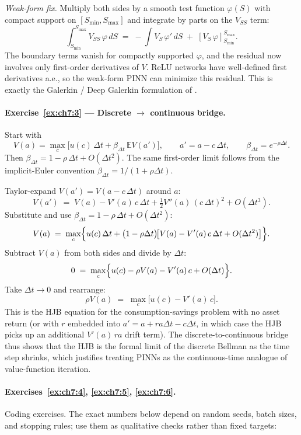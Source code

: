 \documentclass[11pt,a4paper]{report}
\begin{document}
\emph{Weak-form fix.}  Multiply both sides by a smooth test function $\varphi(S)$ with compact support on $[S_\mathrm{min}, S_\mathrm{max}]$ and integrate by parts on the $V_{SS}$ term:
\[
   \int_{S_\mathrm{min}}^{S_\mathrm{max}}\! V_{SS}\,\varphi\, dS \;=\; -\int V_S\,\varphi'\, dS \;+\;[V_S\,\varphi]_{S_\mathrm{min}}^{S_\mathrm{max}}.
\]
The boundary terms vanish for compactly supported $\varphi$, and the residual now involves only first-order derivatives of $V$.  ReLU networks have well-defined first derivatives a.e., so the weak-form PINN can minimize this residual.  This is exactly the Galerkin / Deep Galerkin formulation of \citet{sirignano2018dgm}.

\paragraph{Exercise~\ref{ex:ch7:3} --- Discrete $\to$ continuous bridge.}
Start with
\[
V(a) = \max_c \bigl[u(c)\,\Delta t + \beta_{\Delta t}\,\mathbb{E}V(a')\bigr],
\qquad
a' = a - c\,\Delta t,
\qquad
\beta_{\Delta t}=e^{-\rho\Delta t}.
\]
Then $\beta_{\Delta t}=1-\rho\,\Delta t+O(\Delta t^2)$.  The same first-order limit follows from the implicit-Euler convention $\beta_{\Delta t}=1/(1+\rho\Delta t)$.

Taylor-expand $V(a') = V(a - c\,\Delta t)$ around $a$:
\[
   V(a') \;=\; V(a) - V'(a)\,c\,\Delta t + \tfrac{1}{2}V''(a)\,(c\,\Delta t)^2 + O(\Delta t^3).
\]
Substitute and use $\beta_{\Delta t} = 1 - \rho\,\Delta t + O(\Delta t^2)$:
\[
   V(a) \;=\; \max_c \Bigl\{u(c)\,\Delta t + \bigl(1 - \rho\Delta t\bigr)\!\bigl[V(a) - V'(a)\,c\,\Delta t + O(\Delta t^2)\bigr]\Bigr\}.
\]
Subtract $V(a)$ from both sides and divide by $\Delta t$:
\[
   0 \;=\; \max_c\Bigl\{u(c) - \rho V(a) - V'(a)\,c + O(\Delta t)\Bigr\}.
\]
Take $\Delta t \to 0$ and rearrange:
\[
   \rho V(a) \;=\; \max_c \bigl[u(c) - V'(a)\,c\bigr].
\]
This is the HJB equation for the consumption-savings problem with no asset return (or with $r$ embedded into $a' = a + ra\Delta t - c\Delta t$, in which case the HJB picks up an additional $V'(a)\,r a$ drift term).  The discrete-to-continuous bridge thus shows that the HJB is the formal limit of the discrete Bellman as the time step shrinks, which justifies treating PINNs as the continuous-time analogue of value-function iteration.

\paragraph{Exercises~\ref{ex:ch7:4}, \ref{ex:ch7:5}, \ref{ex:ch7:6}.}
Coding exercises.  The exact numbers below depend on random seeds, batch sizes, and stopping rules; use them as qualitative checks rather than fixed targets:
\end{document}
